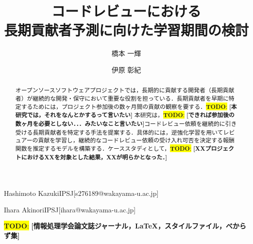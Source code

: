 \documentclass[submit,techrep,noauthor]{ipsj}
\newcommand{\todo}[1]{\colorbox{yellow}{{\bf TODO}:}{\color{red} {\textbf{[#1]}}}}
\begin{document}
\title{コードレビューにおける\\長期貢献者予測に向けた学習期間の検討}


\author{橋本 一輝}{Hashimoto Kazuki}{IPSJ}[s276189@wakayama-u.ac.jp]
\author{伊原 彰紀}{Ihara Akinori}{IPSJ}[ihara@wakayama-u.ac.jp]


\begin{abstract}
オープンソースソフトウェアプロジェクトでは，長期的に貢献する開発者（長期貢献者）が継続的な開発・保守において重要な役割を担っている．長期貢献者を早期に特定するためには，プロジェクト参加後の数ヶ月間の貢献の観察を要する．\todo{本研究では，それをなんとかするって言いたい}
本研究は，\todo{できれば参加後の数ヶ月を必要としない．．．みたいなこと言いたい}コードレビュー依頼を継続的に引き受ける長期貢献者を特定する手法を提案する．具体的には，逆強化学習を用いてレビュアーの貢献を学習し，継続的なコードレビュー依頼の受け入れ可否を決定する報酬関数を推定するモデルを構築する．ケーススタディとして，\todo{XXプロジェクトにおけるXXを対象とした結果，XXが明らかとなった．}
\end{abstract}


%
\begin{jkeyword}
\todo{情報処理学会論文誌ジャーナル，\LaTeX，スタイルファイル，べからず集}
\end{jkeyword}
%
%
\end{document}
